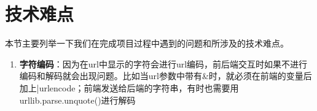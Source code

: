 
\section{技术难点}

本节主要列举一下我们在完成项目过程中遇到的问题和所涉及的技术难点。

\begin{enumerate}
\item {\bf 字符编码}：因为在url中显示的字符会进行url编码，前后端交互时如果不进行编码和解码就会出现问题。比如当url参数中带有\&时，就必须在前端的变量后加上|urlencode；前端发送给后端的字符串，有时也需要用urllib.parse.unquote()进行解码
\end{enumerate}


